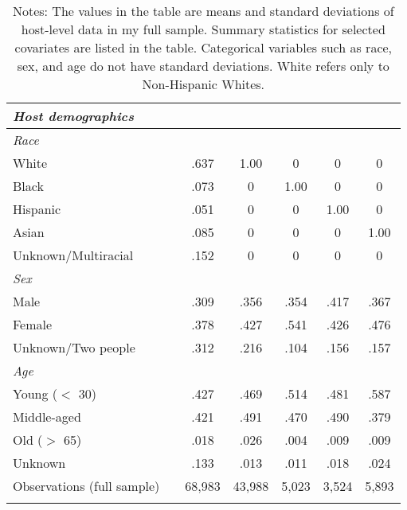 {\begin{longtable}{l*{6}{c}}
		\textit{Host demographics} \\
		\hline
		\textit{Race} \\
		White     & &      .637         &       1.00         &      0         &      0 	& 		0         \\
		Black     &  &    .073       &       0         &      1.00         &      0 	& 		0         \\
		Hispanic     & &      .051         &       0         &      0         &      1.00 	& 		0         \\
		Asian     &   &   .085      &       0         &      0         &      0 	& 		1.00         \\
		Unknown/Multiracial     & &      .152         &       0         &      0         &      0 	& 		0         \\
		[1em]
		\textit{Sex} \\
		Male     & &      .309         &       .356         &      .354         &      .417 	& 		.367        \\
		Female     & &      .378         &       .427        &      .541         &      .426 	& 		.476         \\
		Unknown/Two people   &  &      .312         &       .216         &      .104         &      .156 	& 		.157         \\
		[1em]
		\textit{Age} \\
		Young ($<$ 30)     & &      .427         &       .469         &      .514        &      .481 	& 		.587         \\
		Middle-aged     & &      .421         &       .491        &      .470         &      .490 		& 		.379         \\
		Old ($>$ 65)     & &      .018         &       .026         &      .004         &      .009	& 		.009         \\
		Unknown    &  &      .133         &       .013         &      .011         &      .018 	& 		.024         \\
		[1em]

		
		\hline
		Observations (full sample)    &  & 68,983   &       43,988         &       5,023         &       3,524         &       5,893         \\
		\hline\hline
		\caption*{Notes: The values in the table are means and standard deviations of host-level data in my full sample. Summary statistics for selected covariates are listed in the table. Categorical variables such as race, sex, and age do not have standard deviations. White refers only to Non-Hispanic Whites.}
		
	\end{longtable}
}

